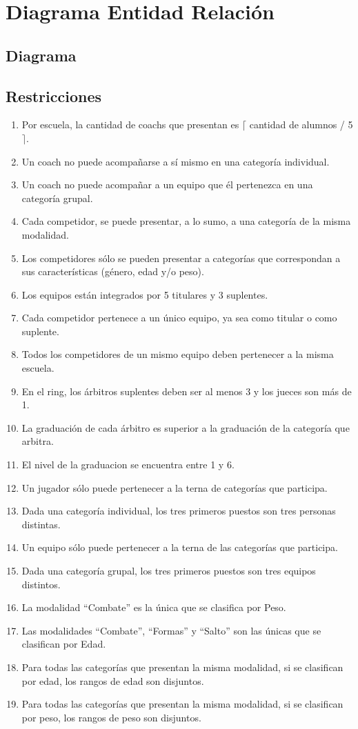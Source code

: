 \section{Diagrama Entidad Relación}
\subsection{Diagrama}
\subsection{Restricciones}

\begin{enumerate}
\item Por escuela, la cantidad de coachs que presentan es $\lceil$ cantidad de alumnos / 5 $\rceil$.
\item Un coach no puede acompañarse a sí mismo en una categor\'ia individual.
\item Un coach no puede acompañar a un equipo que él pertenezca en una categor\'ia grupal.
\item Cada competidor, se puede presentar, a lo sumo, a una categoría de la misma modalidad.
\item Los competidores s\'olo se pueden presentar a categor\'ias que correspondan a sus caracter\'isticas (g\'enero, edad y/o peso).
\item Los equipos están integrados por 5 titulares y 3 suplentes.
\item Cada competidor pertenece a un único equipo, ya sea como titular o como suplente.
\item Todos los competidores de un mismo equipo deben pertenecer a la misma escuela.
\item En el ring, los \'arbitros suplentes deben ser al menos 3 y los jueces son m\'as de 1.
\item La graduaci\'on de cada \'arbitro es superior a la graduaci\'on de la categor\'ia que arbitra.
\item El nivel de la graduacion se encuentra entre 1 y 6.
\item Un jugador s\'olo puede pertenecer a la terna de categor\'ias que participa.
\item Dada una categor\'ia individual, los tres primeros puestos son tres personas distintas.
\item Un equipo s\'olo puede pertenecer a la terna de las categor\'ias que participa.
\item Dada una categor\'ia grupal, los tres primeros puestos son tres equipos distintos.
\item La modalidad ``Combate'' es la \'unica que se clasifica por Peso.
\item Las modalidades ``Combate'', ``Formas'' y ``Salto'' son las \'unicas que se clasifican por Edad.
\item Para todas las categor\'ias que presentan la misma modalidad, si se clasifican por edad, los rangos de edad son disjuntos.
\item Para todas las categor\'ias que presentan la misma modalidad, si se clasifican por peso, los rangos de peso son disjuntos.
\end{enumerate}
